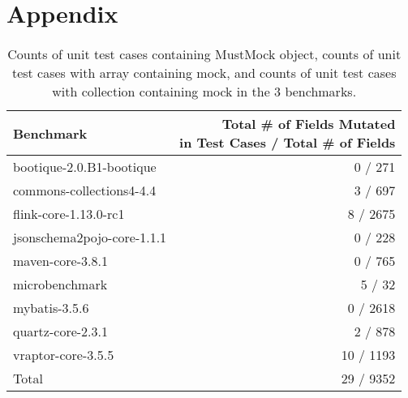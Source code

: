 \section*{Appendix}
\label{sec:appendix}

\begin{table*}[b]
	\centering
	\caption{Counts of unit test cases containing MustMock object, counts of unit test cases with array containing mock, and counts of unit test cases with collection containing mock in the 3 benchmarks.}
	\begin{tabular}{lr}
		\toprule
		Benchmark &  \thead{ Total \# of Fields Mutated \\ in Test Cases / Total \#  of Fields} \\
		\midrule
		bootique-2.0.B1-bootique           			&  0 / 271       \\
		commons-collections4-4.4           			&  3 / 697       \\
		flink-core-1.13.0-rc1           			&  8 / 2675       \\
		jsonschema2pojo-core-1.1.1           		&  0 / 228       \\
		maven-core-3.8.1           					&  0 / 765       \\
		microbenchmark           					&  5 / 32       \\
		mybatis-3.5.6           					&  0 / 2618       \\
		quartz-core-2.3.1           				&  2 / 878       \\
		vraptor-core-3.5.5           				&  10 / 1193       \\
		\bottomrule
		Total           				&  29 / 9352       \\
	\end{tabular}
	\label{tab:mutations}
\end{table*}
